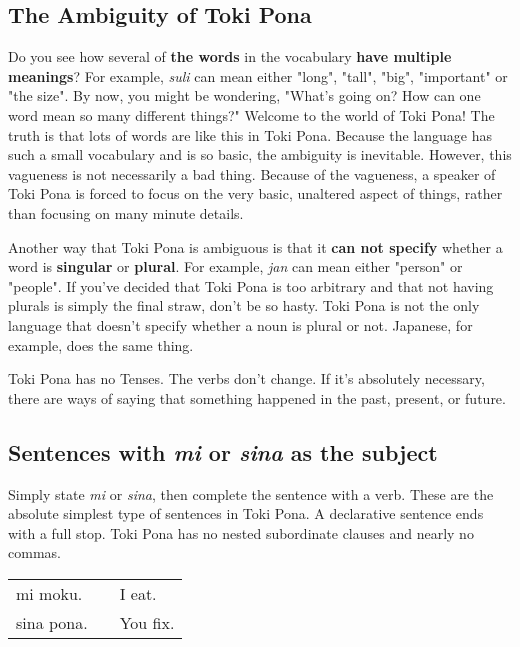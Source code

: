 \subsection*{The Ambiguity of Toki Pona}
%
Do you see how several of \textbf{the words} in the vocabulary \textbf{have multiple meanings}? 
For example, \textit{suli} can mean either "long", "tall", "big", "important" or "the size". 
By now, you might be wondering, "What's going on? How can one word mean so many different things?" 
Welcome to the world of Toki Pona! The truth is that lots of words are like this in Toki Pona. 
Because the language has such a small vocabulary and is so basic, the ambiguity is inevitable. 
However, this vagueness is not necessarily a bad thing. Because of the vagueness, a speaker of Toki Pona is forced to focus on the very basic, unaltered aspect of things, rather than focusing on many minute details. 

Another way that Toki Pona is ambiguous is that it \textbf{can not specify} whether a word is \textbf{singular} or \textbf{plural}. 
For example, \textit{jan} can mean either "person" or "people". 
If you've decided that Toki Pona is too arbitrary and that not having plurals is simply the final straw, don't be so hasty. 
Toki Pona is not the only language that doesn't specify whether a noun is plural or not. 
Japanese, for example, does the same thing. 

Toki Pona has no Tenses. 
The verbs don't change. 
If it's absolutely necessary, there are ways of saying that something happened in the past, present, or future. 
% 
\subsection*{Sentences with \textit{mi} or \textit{sina }as the subject}
%
Simply state \textit{mi} or \textit{sina}, then complete the sentence with a verb. 
These are the absolute simplest type of sentences in Toki Pona. 
A declarative sentence ends with a full stop. 
Toki Pona has no nested subordinate clauses and nearly no commas. 

\begin{supertabular}{p{5,5cm}|ll}
mi moku. && I eat. \\
sina pona. && You fix. \\
\end{supertabular} 

